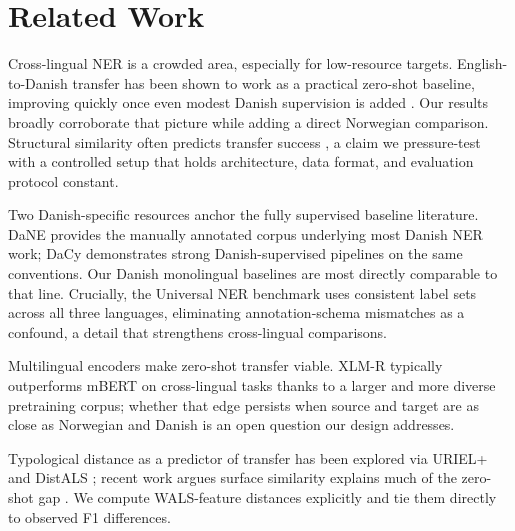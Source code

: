 \section{Related Work}
Cross-lingual NER is a crowded area, especially for low-resource targets. English-to-Danish transfer has been shown to work as a practical zero-shot baseline, improving quickly once even modest Danish supervision is added \citep{plank2020danish}. Our results broadly corroborate that picture while adding a direct Norwegian comparison. Structural similarity often predicts transfer success \citep{fu2023heterogeneous}, a claim we pressure-test with a controlled setup that holds architecture, data format, and evaluation protocol constant.

Two Danish-specific resources anchor the fully supervised baseline literature. DaNE \citep{hvingelby2020dane} provides the manually annotated corpus underlying most Danish NER work; DaCy \citep{enevoldsen2021dacy} demonstrates strong Danish-supervised pipelines on the same conventions. Our Danish monolingual baselines are most directly comparable to that line. Crucially, the Universal NER benchmark \citep{mayhew2024universal} uses consistent label sets across all three languages, eliminating annotation-schema mismatches as a confound, a detail that strengthens cross-lingual comparisons.

Multilingual encoders make zero-shot transfer viable. XLM-R \citep{conneau2020xlmr} typically outperforms mBERT \citep{devlin2019bert} on cross-lingual tasks thanks to a larger and more diverse pretraining corpus; whether that edge persists when source and target are as close as Norwegian and Danish is an open question our design addresses.

Typological distance as a predictor of transfer has been explored via URIEL+ \citep{khan2025urielplus} and DistALS \citep{goot2025distals}; recent work argues surface similarity explains much of the zero-shot gap \citep{sohn2024zeroshot}. We compute WALS-feature distances explicitly and tie them directly to observed F1 differences.
